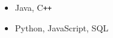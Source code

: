 \begin{minipage}{3.2in}
    \begin{itemize}\vspace{-2mm}
        \small\bfseries\sffamily
        \item \texttt{\faJava}Java, \space C\texttt{++}    
        \item \texttt{\faPython}Python, \texttt{\faJs}JavaScript, \texttt{\faDatabase}SQL
        \vspace{2mm}
    \end{itemize}
\end{minipage}